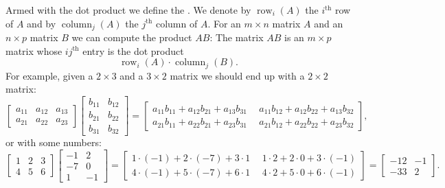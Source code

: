 Armed with the dot product we define the
\emph{}.
We denote by $\operatorname{row}_i(A)$ the $i^{\text{th}}$ row
of $A$ and by
$\operatorname{column}_j(A)$ the $j^{\text{th}}$ column of $A$.
For an $m \times n$ matrix $A$ and an $n \times p$ matrix $B$
we can compute the product $AB$:  The matrix $AB$ is an $m \times p$
matrix whose $ij^{\text{th}}$ entry is the dot product
\begin{equation*}
\operatorname{row}_i(A) \cdot
\operatorname{column}_j(B) .
\end{equation*}
For example, given a $2 \times 3$ and a $3 \times 2$ matrix
we should end up with a $2 \times 2$ matrix:
\begin{equation} \label{linalg:eqmatrixmulex}
\begin{bmatrix}
a_{11} & a_{12} & a_{13} \\
a_{21} & a_{22} & a_{23}
\end{bmatrix}
\begin{bmatrix}
b_{11} & b_{12} \\
b_{21} & b_{22} \\
b_{31} & b_{32}
\end{bmatrix}
=
\begin{bmatrix}
a_{11} b_{11} +
a_{12} b_{21} +
a_{13} b_{31} & ~~
a_{11} b_{12} +
a_{12} b_{22} +
a_{13} b_{32} \\
a_{21} b_{11} +
a_{22} b_{21} +
a_{23} b_{31} & ~~
a_{21} b_{12} +
a_{22} b_{22} +
a_{23} b_{32}
\end{bmatrix} ,
\end{equation}
or with some numbers:
\begin{equation*}
\begin{bmatrix}
1 & 2 & 3 \\
4 & 5 & 6
\end{bmatrix}
\begin{bmatrix}
-1 & 2 \\
-7 & 0 \\
1 & -1
\end{bmatrix}
=
\begin{bmatrix}
1\cdot (-1) + 2\cdot (-7) + 3 \cdot 1 & ~~
1\cdot 2 + 2\cdot 0 + 3 \cdot (-1) \\
4\cdot (-1) + 5\cdot (-7) + 6 \cdot 1 & ~~
4\cdot 2 + 5\cdot 0 + 6 \cdot (-1)
\end{bmatrix}
=
\begin{bmatrix}
-12 & -1 \\
-33 & 2
\end{bmatrix} .
\end{equation*}

